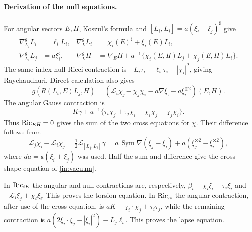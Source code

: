 \paragraph{Derivation of the null equations.}
For angular vectors $E,H$, Koszul's formula and
$[L_i,L_j]=a(\xi_i-\xi_j)^\sharp$ give
\begin{equation}\label{in:connection-identities}
\begin{aligned}
 \nabla^g_{L_i}L_i&=\ell_iL_i,&
 \nabla^g_E L_i&=\chi_i(E)^\sharp+\xi_i(E)L_i,\\
 \nabla^g_{L_i}L_j&=a\xi_i^\sharp,&
 \nabla^g_EH&=\nabla_EH+
      a^{-1}\{\chi_i(E,H)L_j+\chi_j(E,H)L_i\}.
\end{aligned}
\end{equation}
The same-index null Ricci contraction is
$-L_i\tau_i+\ell_i\tau_i-|\chi_i|^2$, giving Raychaudhuri.
Direct calculation also gives
\[
 g(R(L_i,E)L_j,H)
 =(\mathscr L_i\chi_j-\chi_j\chi_i
       -a\nabla\xi_i-a\xi_i^{\otimes2})(E,H).
\]
The angular Gauss contraction is
\[
 K\gamma+a^{-1}
 \{\tau_i\chi_j+\tau_j\chi_i-\chi_i\chi_j-\chi_j\chi_i\}.
\]
Thus $\operatorname{Ric}_{EH}=0$ gives the sum of the two cross equations for
$\chi$.  Their difference follows from
\[
 \mathscr L_j\chi_i-\mathscr L_i\chi_j
 =\tfrac12\mathcal L_{[L_j,L_i]}\gamma
 =a\,\operatorname{Sym}\nabla(\xi_j-\xi_i)
     +a(\xi_j^{\otimes2}-\xi_i^{\otimes2}),
\]
where $da=a(\xi_i+\xi_j)$ was used.  Half the sum and difference give
the cross-shape equation of \eqref{in:vacuum}.

In $\operatorname{Ric}_{iE}$ the angular and null contractions are, respectively,
$\beta_i-\chi_i\xi_i+\tau_i\xi_i$ and
$-\mathscr L_i\xi_j+\chi_i\xi_i$.  This proves the torsion equation.
In $\operatorname{Ric}_{ji}$ the angular contraction, after use of the cross
equation, is $aK-\chi_i\cdot\chi_j+\tau_i\tau_j$, while the remaining
contraction is
$a(2\xi_i\cdot\xi_j-|\xi_i|^2)-L_j\ell_i$.  This proves the lapse
equation.

